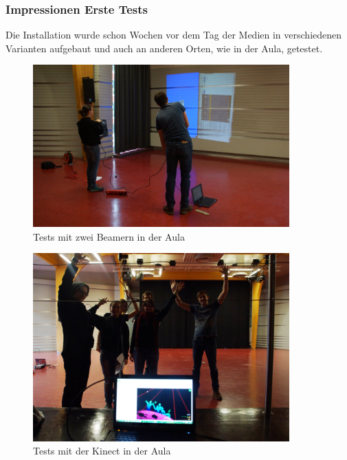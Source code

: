 \clearpage

\subsubsection{Impressionen Erste Tests}
Die Installation wurde schon Wochen vor dem Tag der Medien in verschiedenen Varianten aufgebaut und auch an anderen Orten, wie in der Aula, getestet.

\begin{figure}[htbp]
	\centering
		\includegraphics[width=0.88\textwidth]{images/Test1.png}
	\caption{Tests mit zwei Beamern in der Aula}
	\label{fig:Test1}
\end{figure}

\begin{figure}[htbp]
	\centering
		\includegraphics[width=0.88\textwidth]{images/Test2.png}
	\caption{Tests mit der Kinect in der Aula}
	\label{fig:Test2}
\end{figure}

